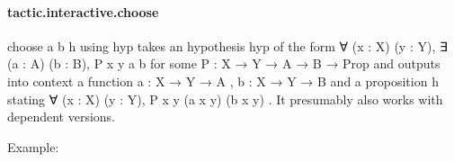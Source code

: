 \documentclass{article}
\begin{document}
\paragraph{tactic.interactive.choose}
\par
\colorbox[RGB]{253,246,227}{{{{\color[RGB]{101, 123, 131} choose a b h  }}}{{{\color[RGB]{133, 153, 0} using }}}{{{\color[RGB]{101, 123, 131}  hyp }}}} takes an hypothesis 
\colorbox[RGB]{253,246,227}{{{{\color[RGB]{101, 123, 131} hyp }}}} of the form
\colorbox[RGB]{253,246,227}{{{{\color[RGB]{101, 123, 131} ∀ (x : X) (y : Y), ∃ (a : A) (b : B), P x y a b }}}} for some 
\colorbox[RGB]{253,246,227}{{{{\color[RGB]{101, 123, 131} P : X  }}}{{{\color[RGB]{133, 153, 0} → }}}{{{\color[RGB]{101, 123, 131}  Y  }}}{{{\color[RGB]{133, 153, 0} → }}}{{{\color[RGB]{101, 123, 131}  A  }}}{{{\color[RGB]{133, 153, 0} → }}}{{{\color[RGB]{101, 123, 131}  B  }}}{{{\color[RGB]{133, 153, 0} → }}}{{{\color[RGB]{101, 123, 131}   }}}{{{\color[RGB]{38, 139, 210} Prop }}}} and outputs
into context a function 
\colorbox[RGB]{253,246,227}{{{{\color[RGB]{101, 123, 131} a : X  }}}{{{\color[RGB]{133, 153, 0} → }}}{{{\color[RGB]{101, 123, 131}  Y  }}}{{{\color[RGB]{133, 153, 0} → }}}{{{\color[RGB]{101, 123, 131}  A }}}}, 
\colorbox[RGB]{253,246,227}{{{{\color[RGB]{101, 123, 131} b : X  }}}{{{\color[RGB]{133, 153, 0} → }}}{{{\color[RGB]{101, 123, 131}  Y  }}}{{{\color[RGB]{133, 153, 0} → }}}{{{\color[RGB]{101, 123, 131}  B }}}} and a proposition 
\colorbox[RGB]{253,246,227}{{{{\color[RGB]{101, 123, 131} h }}}} stating
\colorbox[RGB]{253,246,227}{{{{\color[RGB]{101, 123, 131} ∀ (x : X) (y : Y), P x y (a x y) (b x y) }}}}. It presumably also works with dependent versions.
\par
Example:
\\
\end{document}
